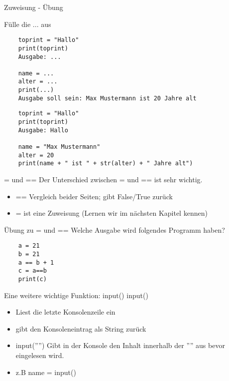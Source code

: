 \begin{frame}[fragile]{Zuweisung - Übung}

	Fülle die ... aus
	\begin{lstlisting}
	toprint = "Hallo"
	print(toprint)
	Ausgabe: ...
	
	name = ...
	alter = ...
	print(...)
	Ausgabe soll sein: Max Mustermann ist 20 Jahre alt
	\end{lstlisting}
	
	\pause{}
	
	\begin{lstlisting}
	toprint = "Hallo"
	print(toprint)
	Ausgabe: Hallo
	
	name = "Max Mustermann"
	alter = 20
	print(name + " ist " + str(alter) + " Jahre alt")
	\end{lstlisting}

\end{frame}


\begin{frame}[fragile]{= und == }
Der Unterschied zwischen = und == ist sehr wichtig.
\begin{itemize}
\item == Vergleich beider Seiten; gibt False/True zurück
\item = ist eine Zuweisung (Lernen wir im nächsten Kapitel kennen)
\end{itemize}
\end{frame}

\begin{frame}[fragile]{Übung zu = und == }
Welche Ausgabe wird folgendes Programm haben?
	\begin{lstlisting}
	a = 21
	b = 21
	a == b + 1
	c = a==b
	print(c)
	\end{lstlisting}
\end{frame}


\begin{frame}[fragile]{Eine weitere wichtige Funktion: input()}
input()
\begin{itemize}
\item Liest die letzte Konsolenzeile ein
\item gibt den Konsoleneintrag als String zurück
\item input('''') Gibt in der Konsole den Inhalt innerhalb der '''' aus bevor eingelesen wird.
\item z.B name = input() 
\end{itemize}
\end{frame}

